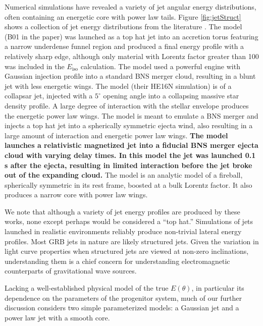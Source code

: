 \documentclass[twocolumn]{aastex62}
\newcommand{\Eiso}{\ensuremath{E_{\mathrm{iso}}}}
\begin{document}
Numerical simulations have revealed a variety of jet angular energy distributions, often containing an energetic core with power law tails.  Figure \ref{fig:jetStruct} shows a collection of jet energy distributions from the literature \citep{Aloy:2005aa, Mizuta:2009aa, Duffell:2013aa, Lazzati:2017aa, Margutti:2018aa, Geng:2019aa}.  The \citet{Aloy:2005aa} model (B01 in the paper) was launched as a top hat jet into an accretion torus featuring a narrow underdense funnel region and produced a final energy profile with a relatively sharp edge, although only material with Lorentz factor greater than 100 was included in the $\Eiso$ calculation.  The \citet{Margutti:2018aa} model used a powerful engine with Gaussian injection profile into a standard BNS merger cloud, resulting in a blunt jet with less energetic wings.  The \citet{Mizuta:2009aa} model (their HE16N simulation) is of a collapsar jet, injected with a $5^\circ$ opening angle into a collapsing massive star density profile.  A large degree of interaction with the stellar envelope produces the energetic power law wings.  The \citet{Lazzati:2017aa} model is meant to emulate a BNS merger and injects a top hat jet into a spherically symmetric ejecta wind, also resulting in a large amount of interaction and energetic power law wings.  {\bf The \citet{Geng:2019aa} model launches a relativistic magnetized jet into a fiducial BNS merger ejecta cloud with varying delay times.  In this model the jet was launched 0.1 s after the ejecta, resulting in limited interaction before the jet broke out of the expanding cloud. } The \citet{Duffell:2013aa} model is an analytic model of a fireball, spherically symmetric in its rest frame, boosted at a bulk Lorentz factor. It also produces a narrow core with power law wings.

We note that although a variety of jet energy profiles are produced by these works, none except perhaps \citet{Aloy:2005aa} would be considered a ``top hat.''  Simulations of jets launched in realistic environments reliably produce non-trivial lateral energy profiles.  Most GRB jets in nature are likely structured jets.  Given the variation in light curve properties when structured jets are viewed at non-zero inclinations, understanding them is a chief concern for understanding electromagnetic counterparts of gravitational wave sources.

Lacking a well-established physical model of the true $E(\theta)$, in particular its dependence on the parameters of the progenitor system, much of our further discussion considers two simple parameterized models: a Gaussian jet and a power law jet with a smooth core.  
\end{document}
